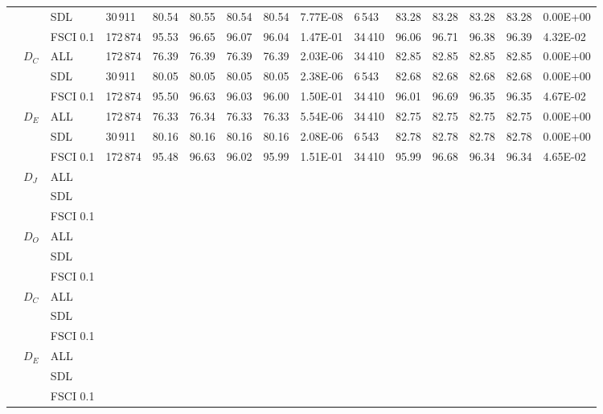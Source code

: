 \begin{table*}[h]
\begin{tabular}{|lllllllllllllll|}
 & & SDL & 30\,911 & 80.54  & 80.55  & 80.54 & 80.54   & 7.77E-08 & 6\,543   & 83.28  & 83.28  & 83.28 & 83.28   & 0.00E+00    \\
 & & FSCI 0.1    & 172\,874& 95.53  & 96.65  & 96.07 & 96.04   & 1.47E-01  & 34\,410  & 96.06  & 96.71  & 96.38 & 96.39   & 4.32E-02    \\
 & \multirow{3}{*}{$D_C$}    & ALL& 172\,874 & 76.39  & 76.39  & 76.39 & 76.39   & 2.03E-06  & 34\,410  & 82.85  & 82.85  & 82.85 & 82.85   & 0.00E+00    \\
 & & SDL & 30\,911 & 80.05  & 80.05  & 80.05 & 80.05   & 2.38E-06 & 6\,543   & 82.68  & 82.68  & 82.68 & 82.68   & 0.00E+00    \\
 & & FSCI 0.1   & 172\,874 & 95.50  & 96.63  & 96.03 & 96.00   & 1.50E-01 & 34\,410   & 96.01  & 96.69  & 96.35 & 96.35   & 4.67E-02    \\
 & \multirow{3}{*}{$D_E$} & ALL & 172\,874& 76.33  & 76.34  & 76.33 & 76.33   & 5.54E-06 & 34\,410   & 82.75  & 82.75  & 82.75 & 82.75   & 0.00E+00    \\
 & & SDL & 30\,911 & 80.16  & 80.16  & 80.16 & 80.16   & 2.08E-06 & 6\,543   & 82.78  & 82.78  & 82.78 & 82.78   & 0.00E+00    \\
 & & FSCI 0.1   & 172\,874 & 95.48  & 96.63  & 96.02 & 95.99   & 1.51E-01  & 34\,410  & 95.99  & 96.68  & 96.34 & 96.34   & 4.65E-02   \\
\hline
\multirow{12}{*}{\SAIL{}} & \multirow{3}{*}{$D_J$}   & ALL & & &    &  & & & &    &  &    \\
 & & SDL & & &    &  & & & &    &  &    \\
 & & FSCI 0.1    & & &    &  & & & &    &  & \\
 & \multirow{3}{*}{$D_O$}    & ALL & & &    &  & & & &    &  &    \\
 & & SDL & & &    &  & & & &    &  & \\
 & & FSCI 0.1    & & &    &  & & & &    &  & \\
 & \multirow{3}{*}{$D_C$}    & ALL & & &    &  & & & &    &  &    \\
 & & SDL & & &    &  & & & &    &  &    \\
 & & FSCI 0.1   & & &    &  & & & &    &  & \\
 & \multirow{3}{*}{$D_E$} & ALL & & &    &  & & & &    &  &    \\
 & & SDL & & &    &  & & & &    &  &    \\
 & & FSCI 0.1   & & &    &  & & & &    &  &    \\
\hline
\end{tabular}
\end{table*}










